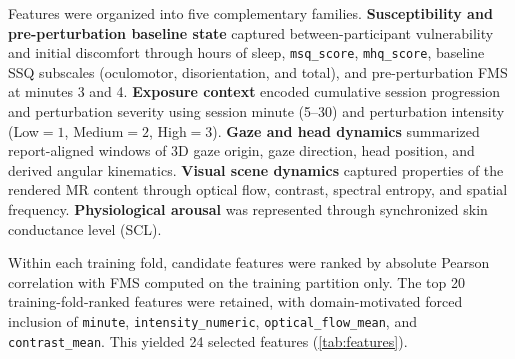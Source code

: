 \documentclass[review]{vgtc}              %
\begin{document}
Features were organized into five complementary families. \textbf{Susceptibility and pre-perturbation baseline state} captured between-participant vulnerability and initial discomfort through hours of sleep, \texttt{msq\_score}, \texttt{mhq\_score}, baseline SSQ subscales (oculomotor, disorientation, and total), and pre-perturbation FMS at minutes 3 and 4. \textbf{Exposure context} encoded cumulative session progression and perturbation severity using session minute (5--30) and perturbation intensity (Low$=1$, Medium$=2$, High$=3$). \textbf{Gaze and head dynamics} summarized report-aligned windows of 3D gaze origin, gaze direction, head position, and derived angular kinematics. \textbf{Visual scene dynamics} captured properties of the rendered MR content through optical flow, contrast, spectral entropy, and spatial frequency. \textbf{Physiological arousal} was represented through synchronized skin conductance level (SCL).

Within each training fold, candidate features were ranked by absolute Pearson correlation with FMS computed on the training partition only. The top 20 training-fold-ranked features were retained, with domain-motivated forced inclusion of \texttt{minute}, \texttt{intensity\_numeric}, \texttt{optical\_flow\_mean}, and \texttt{contrast\_mean}. This yielded 24 selected features (\cref{tab:features}).
\end{document}
